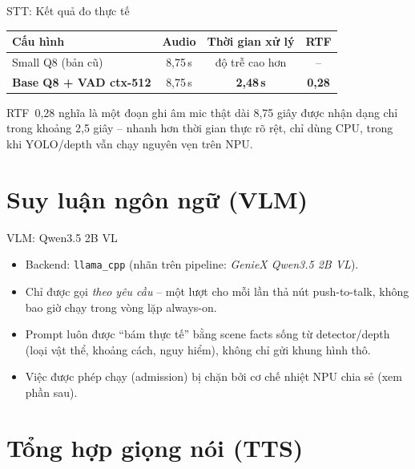 \documentclass[aspectratio=169]{beamer}
\begin{document}
\begin{frame}{STT: Kết quả đo thực tế}
  \centering
  \begin{tabular}{lccc}
    \toprule
    \textbf{Cấu hình} & \textbf{Audio} & \textbf{Thời gian xử lý} & \textbf{RTF} \\
    \midrule
    Small Q8 (bản cũ) & 8,75\,s & độ trễ cao hơn & -- \\
    \textbf{Base Q8 + VAD ctx-512} & 8,75\,s & \textbf{2,48\,s} & \textbf{0,28} \\
    \bottomrule
  \end{tabular}
  \vspace{10pt}

  RTF~0,28 nghĩa là một đoạn ghi âm mic thật dài 8,75 giây được nhận dạng
  chỉ trong khoảng 2,5 giây -- nhanh hơn thời gian thực rõ rệt, chỉ dùng CPU,
  trong khi YOLO/depth vẫn chạy nguyên vẹn trên NPU.
\end{frame}

\section{Suy luận ngôn ngữ (VLM)}

\begin{frame}{VLM: Qwen3.5 2B VL}
  \begin{itemize}
    \item Backend: \texttt{llama\_cpp} (nhãn trên pipeline: \emph{GenieX Qwen3.5 2B VL}).
    \item Chỉ được gọi \emph{theo yêu cầu} -- một lượt cho mỗi lần thả nút
          push-to-talk, không bao giờ chạy trong vòng lặp always-on.
    \item Prompt luôn được ``bám thực tế'' bằng scene facts sống từ detector/depth
          (loại vật thể, khoảng cách, nguy hiểm), không chỉ gửi khung hình thô.
    \item Việc được phép chạy (admission) bị chặn bởi cơ chế nhiệt NPU chia sẻ
          (xem phần sau).
  \end{itemize}
\end{frame}

\section{Tổng hợp giọng nói (TTS)}
\end{document}
